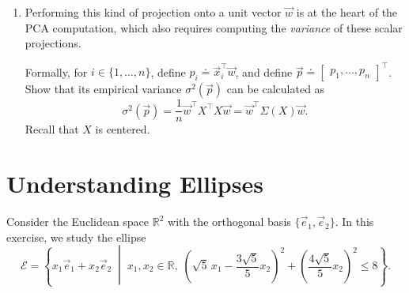 \documentclass[10pt]{article}
\theoremstyle{definition}
\theoremstyle{plain}
\newcommand{\RR}{\mathbb{R}}
\begin{document}
\begin{enumerate}[label=(\alph*)]
Consider vectors $\vec{a}$ and $\vec{b}$ in $\RR^n$. Let $\vec{b}$ be unit norm (i.e., $\left\| \vec{b} \right\|_2^2 = \vec{b}^\top \vec{b} = 1$). We define the following:
\begin{enumerate}[label=\roman*.]
\item The \textbf{vector projection} of $\vec{a}$ on $\vec{b}$ is given by $(\vec{a}^\top \vec{b})\vec{b}$. The vector projection is a vector in $\RR^n$.
\item The \textbf{scalar projection} of $\vec{a}$ on $\vec{b}$ is given by $\vec{a}^\top \vec{b}$. The scalar projection is a scalar but can take both positive and negative values.
\item The \textbf{projection length} of $\vec{a}$ on $\vec{b}$ is given by $\left| \vec{a}^\top \vec{b} \right|$ and is the absolute value of the scalar projection.
\end{enumerate}

Suppose we want to obtain a column vector $\vec{p} \in \RR^n$ whose $i$-th entry is the \textit{scalar} projection of data point $\vec{x}_i$ along the direction given by the unit vector $\vec{w}$. Show that $\vec{p}$ is given by
\begin{equation}
\vec{p} = X\vec{w}.
\end{equation}

\item Performing this kind of projection onto a unit vector $\vec{w}$ is at the heart of the PCA computation, which also requires computing the \textit{variance} of these scalar projections.

Formally, for $i \in \{1, \ldots, n\}$, define $p_i \doteq \vec{x}_i^\top \vec{w}$, and define $\vec{p} \doteq \begin{bmatrix} p_1, \ldots, p_n \end{bmatrix}^\top$. Show that its empirical variance $\sigma^2(\vec{p})$ can be calculated as
\begin{equation}
\sigma^2(\vec{p}) = \frac{1}{n} \vec{w}^\top X^\top X \vec{w} = \vec{w}^\top \Sigma(X) \vec{w}.
\end{equation}
Recall that $X$ is centered.
\end{enumerate}

\section{Understanding Ellipses}

Consider the Euclidean space $\RR^2$ with the orthogonal basis $\{\vec{e}_1, \vec{e}_2\}$. In this exercise, we study the ellipse
\begin{equation}
\mathcal{E} = \left\{ x_1 \vec{e}_1 + x_2 \vec{e}_2 \;\middle|\; x_1, x_2 \in \RR,\; \left( \sqrt{5}\, x_1 - \frac{3\sqrt{5}}{5} x_2 \right)^2 + \left( \frac{4\sqrt{5}}{5} x_2 \right)^2 \leq 8 \right\}.
\end{equation}
\end{document}
